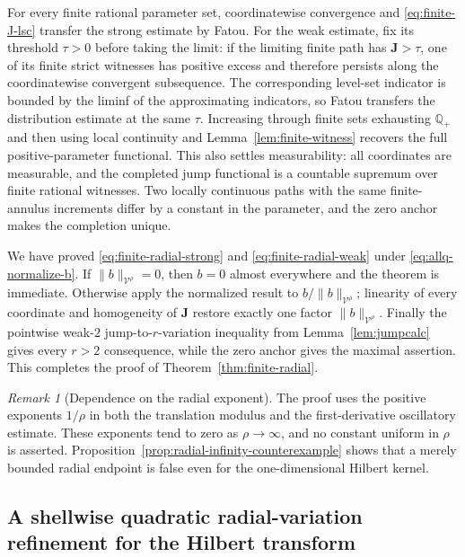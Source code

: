 \documentclass[11pt]{article}
\numberwithin{equation}{section}
\theoremstyle{remark}
\newtheorem{remark}[theorem]{Remark}
\theoremstyle{definition}
\begin{document}
For every finite rational parameter set, coordinatewise convergence and
\eqref{eq:finite-J-lsc} transfer the strong estimate by Fatou.  For the
weak estimate, fix its threshold $\tau>0$ before taking the limit: if the
limiting finite path has $\mathbf J>\tau$, one of its finite strict
witnesses has positive excess and therefore persists along the
coordinatewise convergent subsequence.  The corresponding level-set
indicator is bounded by the liminf of the approximating indicators, so
Fatou transfers the distribution estimate at the same $\tau$.
Increasing through finite sets exhausting $\mathbb Q_+$ and then using
local continuity and Lemma~\ref{lem:finite-witness} recovers the full
positive-parameter functional.  This also settles measurability: all
coordinates are measurable, and the completed jump functional is a
countable supremum over finite rational witnesses.  Two locally
continuous paths with the same finite-annulus increments differ by a
constant in the parameter, and the zero anchor makes the completion
unique.

We have proved \eqref{eq:finite-radial-strong} and
\eqref{eq:finite-radial-weak} under \eqref{eq:allq-normalize-b}.  If
$\|b\|_{\mathcal V^\rho}=0$, then $b=0$ almost everywhere and the theorem
is immediate.  Otherwise apply the normalized result to
$b/\|b\|_{\mathcal V^\rho}$; linearity of every coordinate and
homogeneity of $\mathbf J$ restore exactly one factor
$\|b\|_{\mathcal V^\rho}$.  Finally the pointwise weak-$2$
jump-to-$r$-variation inequality from Lemma~\ref{lem:jumpcalc} gives every
$r>2$ consequence, while the zero anchor gives the maximal assertion.
This completes the proof of Theorem~\ref{thm:finite-radial}.


\begin{remark}[Dependence on the radial exponent]
\label{rem:finite-radial-dependence}
The proof uses the positive exponents $1/\rho$ in both the translation
modulus and the first-derivative oscillatory estimate.  These exponents tend
to zero as $\rho\to\infty$, and no constant uniform in $\rho$ is asserted.
Proposition~\ref{prop:radial-infinity-counterexample} shows that a merely
bounded radial endpoint is false even for the one-dimensional Hilbert
kernel.
\end{remark}


\subsection{A shellwise quadratic radial-variation refinement for the Hilbert transform}
\end{document}
